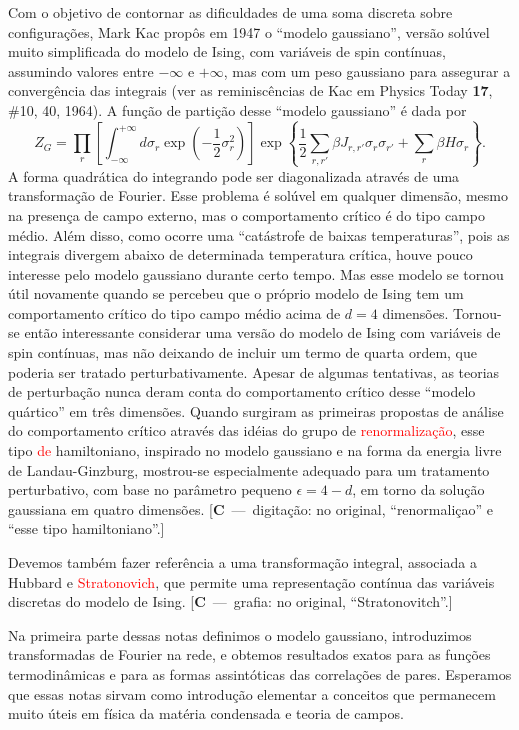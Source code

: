\documentclass[12pt,a4paper]{article}
\newcommand{\corr}[1]{\textcolor{red}{#1}}
\newcounter{corr}
\newcommand{\nota}[2]{\refstepcounter{corr}\label{#1}%
  {\color{red}\small[\textbf{C\thecorr}~---~#2]}}
\begin{document}
Com o objetivo de contornar as dificuldades de uma soma discreta sobre
configurações, Mark Kac propôs em 1947 o ``modelo gaussiano'', versão
solúvel muito simplificada do modelo de Ising, com variáveis de spin
contínuas, assumindo valores entre $-\infty$ e $+\infty$, mas com um peso gaussiano
para assegurar a convergência das integrais (ver as reminiscências de Kac
em Physics Today \textbf{17}, \#10, 40, 1964). A função de partição desse ``modelo
gaussiano'' é dada por
\begin{equation}
Z_G=\prod_r\left[\int_{-\infty}^{+\infty}d\sigma_r\exp\left(-\frac12\sigma_r^2\right)\right]
\exp\left\{\frac12\sum_{r,r'}\beta J_{r,r'}\sigma_r\sigma_{r'}+\sum_r\beta H\sigma_r\right\}.
\end{equation}
A forma quadrática do integrando pode ser diagonalizada através de uma
transformação de Fourier. Esse problema é solúvel em qualquer dimensão,
mesmo na presença de campo externo, mas o comportamento crítico é do
tipo campo médio. Além disso, como ocorre uma ``catástrofe de baixas
temperaturas'', pois as integrais divergem abaixo de determinada temperatura
crítica, houve pouco interesse pelo modelo gaussiano durante certo tempo.
Mas esse modelo se tornou útil novamente quando se percebeu que o próprio
modelo de Ising tem um comportamento crítico do tipo campo médio acima
de $d=4$ dimensões. Tornou-se então interessante considerar uma versão do
modelo de Ising com variáveis de spin contínuas, mas não deixando de incluir
um termo de quarta ordem, que poderia ser tratado perturbativamente.
Apesar de algumas tentativas, as teorias de perturbação nunca deram conta do
comportamento crítico desse ``modelo quártico'' em três dimensões. Quando
surgiram as primeiras propostas de análise do comportamento crítico através
das idéias do grupo de \corr{renormalização}, esse tipo \corr{de} hamiltoniano, inspirado no
modelo gaussiano e na forma da energia livre de Landau-Ginzburg, mostrou-se
especialmente adequado para um tratamento perturbativo, com base no
parâmetro pequeno $\epsilon=4-d$, em torno da solução gaussiana em quatro
dimensões.
\nota{c:renorm}{digitação: no original, ``renormaliçao'' e ``esse tipo hamiltoniano''.}

Devemos também fazer referência a uma transformação integral, associada
a Hubbard e \corr{Stratonovich}, que permite uma representação contínua das
variáveis discretas do modelo de Ising.
\nota{c:strat}{grafia: no original, ``Stratonovitch''.}

Na primeira parte dessas notas definimos o modelo gaussiano, introduzimos
transformadas de Fourier na rede, e obtemos resultados exatos para
as funções termodinâmicas e para as formas assintóticas das correlações de
pares. Esperamos que essas notas sirvam como introdução elementar a
conceitos que permanecem muito úteis em física da matéria condensada e teoria
de campos.
\end{document}
